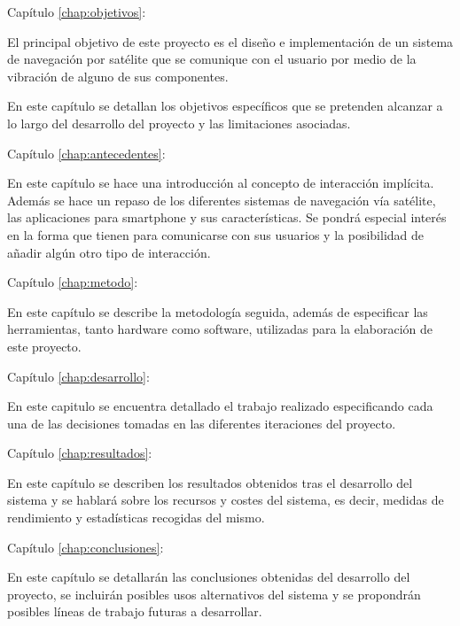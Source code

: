 \begin{definitionlist}
  \item[Capítulo \ref{chap:objetivos}: \nameref{chap:objetivos}] 

  El principal objetivo de este proyecto es el diseño e implementación de un sistema de navegación
  por satélite que se comunique con el usuario por medio de la vibración de alguno de sus
  componentes.

  En este capítulo se detallan los objetivos específicos que se pretenden alcanzar a lo largo del
  desarrollo del proyecto y las limitaciones asociadas.

  \item[Capítulo \ref{chap:antecedentes}: \nameref{chap:antecedentes}]

  En este capítulo se hace una introducción al concepto de interacción implícita. Además se hace un
  repaso de los diferentes sistemas de navegación vía satélite, las aplicaciones para smartphone y
  sus características. Se pondrá especial interés en la forma que tienen para comunicarse con sus
  usuarios y la posibilidad de añadir algún otro tipo de interacción.

  \item[Capítulo \ref{chap:metodo}: \nameref{chap:metodo}]

  En este capítulo se describe la metodología seguida, además de especificar las herramientas,
  tanto hardware como software, utilizadas para la elaboración de este proyecto.

  \item[Capítulo \ref{chap:desarrollo}: \nameref{chap:desarrollo}]

  En este capitulo se encuentra detallado el trabajo realizado especificando cada una de las
  decisiones tomadas en las diferentes iteraciones del proyecto.

  \item[Capítulo \ref{chap:resultados}: \nameref{chap:resultados}]

  En este capítulo se describen los resultados obtenidos tras el desarrollo del sistema y se hablará
  sobre los recursos y costes del sistema, es decir, medidas de rendimiento y estadísticas recogidas
  del mismo.

  \item[Capítulo \ref{chap:conclusiones}: \nameref{chap:conclusiones}]

  En este capítulo se detallarán las conclusiones obtenidas del desarrollo del proyecto, se
  incluirán posibles usos alternativos del sistema y se propondrán posibles líneas de trabajo
  futuras a desarrollar.

\end{definitionlist}

